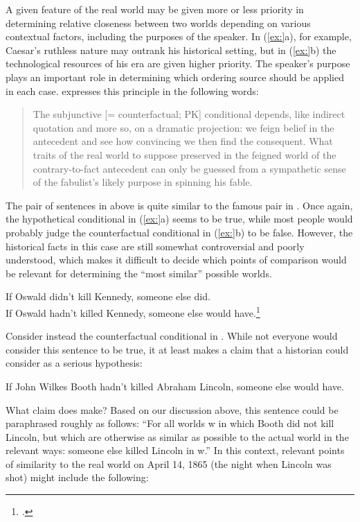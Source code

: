A given feature of the real world may be given more or less priority in determining relative closeness between two worlds depending on various contextual factors, including the purposes of the speaker. In (\ref{ex:}a), for example, Caesar’s ruthless nature may outrank his historical setting, but in (\ref{ex:}b) the technological resources of his era are given higher priority. The speaker’s purpose plays an important role in determining which ordering source should be applied in each case. \citet[221]{Quine1960} expresses this principle in the following words:


\begin{quote}
The subjunctive [= counterfactual; PK] conditional depends, like indirect quotation and more so, on a dramatic projection: we feign belief in the antecedent and see how convincing we then find the consequent. What traits of the real world to suppose preserved in the feigned world of the contrary-to-fact antecedent can only be guessed from a sympathetic sense of the fabulist’s likely purpose in spinning his fable.
\end{quote}


The pair of sentences in  above is quite similar to the famous pair in . Once again, the hypothetical conditional in (\ref{ex:}a) seems to be true, while most people would probably judge the counterfactual conditional in (\ref{ex:}b) to be false. However, the historical facts in this case are still somewhat controversial and poorly understood, which makes it difficult to decide which points of comparison would be relevant for determining the “most similar” possible worlds.


\ea
\ea If Oswald didn’t kill Kennedy, someone else did. \\
\ex If Oswald hadn’t killed Kennedy, someone else would have.\footnote{\citet{Adams1970}.}
                       \z
\z


Consider instead the counterfactual conditional in . While not everyone would consider this sentence to be true, it at least makes a claim that a historian could consider as a serious hypothesis:


\ea
If John Wilkes Booth hadn’t killed Abraham Lincoln, someone else would have.
\z


What claim does  make? Based on our discussion above, this sentence could be paraphrased roughly as follows: “For all worlds w in which Booth did not kill Lincoln, but which are otherwise as similar as possible to the actual world in the relevant ways: someone else killed Lincoln in w.” In this context, relevant points of similarity to the real world on April 14, 1865 (the night when Lincoln was shot) might include the following:


